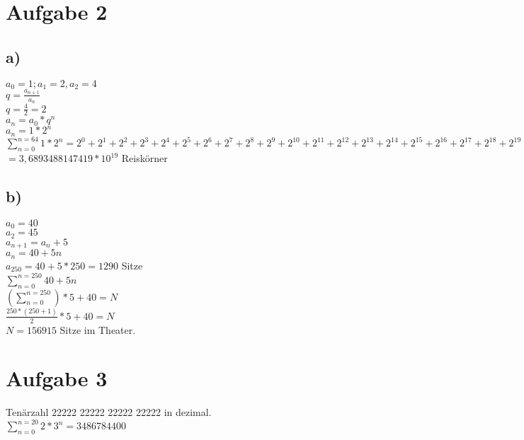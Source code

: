 \documentclass{article}
\begin{document}
	\section*{Aufgabe 2}
	\subsection*{a)}
	$a_{0} = 1; a_{1} = 2, a_{2} = 4$ \\
	$q = \frac{a_{n+1}}{a_{n}}$ \\
	$q = \frac{4}{2} = 2$ \\
	$a_{n} = a_{0} * q^{n}$ \\
	$a_{n} = 1 * 2^{n}$ \\
	$\sum\limits_{n=0}^{n=64} 1 * 2^{n} = 2^{0} + 2^{1} + 2^{2} + 2^{3} + 2^{4} + 2^{5} + 2^{6} + 2^{7} + 2^{8} + 2^{9} + 2^{10} + 2^{11} + 2^{12} + 2^{13} + 2^{14} + 2^{15} + 2^{16} + 2^{17} + 2^{18} + 2^{19} + 2^{20} + 2^{21}  + 2^{22} + 2^{23} + 2^{24} + 2^{25} + 2^{26} + 2^{27} + 2^{28} + 2^{29} + 2^{30} + 2^{31}  + 2^{32} + 2^{33} + 2^{34} + 2^{35} + 2^{36} + 2^{37} + 2^{38} + 2^{39} + 2^{40} + 2^{41}  + 2^{42} + 2^{43} + 2^{44} + 2^{45} + 2^{46} + 2^{47} + 2^{48} + 2^{49} + 2^{50} + 2^{51}  + 2^{52} + 2^{53} + 2^{54} + 2^{55} + 2^{56} + 2^{57} + 2^{58} + 2^{59} + 2^{60} + 2^{61} + 2^{62} + 2^{63} + 2^{64}$ \\
	$= 3,6893488147419 * 10^{19}$ Reiskörner
	
	\subsection*{b)}
	$a_{0} = 40$ \\
	$a_{2} = 45$ \\
	$a_{n+1} = a_{n} + 5$ \\
	$a_{n} = 40 + 5n$ \\
	$a_{250} = 40 + 5 * 250 = 1290$ Sitze \\
	$\sum\limits_{n=0}^{n=250} 40 + 5n$ \\
	$(\sum\limits_{n=0}^{n=250})*5 + 40 = N$ \\
	$\frac{250*(250+1)}{2} * 5 + 40 = N$ \\
	$N = 156915$ Sitze im Theater.
	
	\section*{Aufgabe 3}
	Tenärzahl 22222 22222 22222 22222 in dezimal. \\
	$\sum\limits_{n=0}^{n=20} 2*3^{n} = 3486784400$
\end{document}
